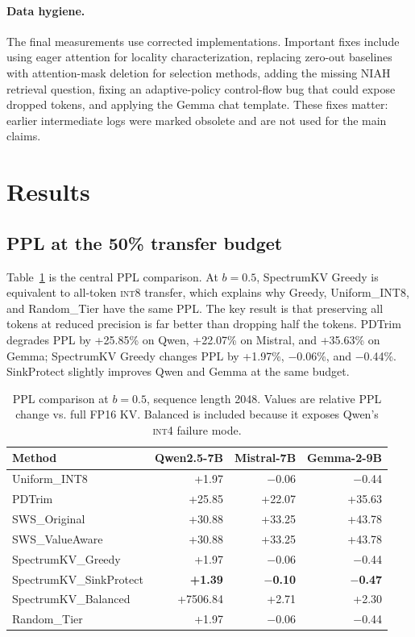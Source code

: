 \documentclass[11pt]{article}
\newcommand{\method}{SpectrumKV}
\newcommand{\niah}{NIAH}
\newcommand{\budget}{b}
\newcommand{\pct}{\%}
\newcommand{\intviii}{\textsc{int8}}
\newcommand{\intiv}{\textsc{int4}}
\theoremstyle{plain}
\theoremstyle{definition}
\begin{document}
\paragraph{Data hygiene.}
The final measurements use corrected implementations.  Important fixes include using eager attention for locality characterization, replacing zero-out baselines with attention-mask deletion for selection methods, adding the missing \niah{} retrieval question, fixing an adaptive-policy control-flow bug that could expose dropped tokens, and applying the Gemma chat template.  These fixes matter: earlier intermediate logs were marked obsolete and are not used for the main claims.

\section{Results}
\label{sec:results}

\subsection{PPL at the 50\pct{} transfer budget}
\label{sec:rq7}

Table~\ref{tab:ppl50} is the central PPL comparison.  At $\budget=0.5$, \method{} Greedy is equivalent to all-token \intviii{} transfer, which explains why Greedy, Uniform\_INT8, and Random\_Tier have the same PPL.  The key result is that preserving all tokens at reduced precision is far better than dropping half the tokens.  PDTrim degrades PPL by +25.85\pct{} on Qwen, +22.07\pct{} on Mistral, and +35.63\pct{} on Gemma; \method{} Greedy changes PPL by +1.97\pct{}, $-$0.06\pct{}, and $-$0.44\pct{}.  SinkProtect slightly improves Qwen and Gemma at the same budget.

\begin{table}[t]
\centering
\caption{PPL comparison at $\budget=0.5$, sequence length 2048.  Values are relative PPL change vs. full FP16 KV.  Balanced is included because it exposes Qwen's \intiv{} failure mode.}
\label{tab:ppl50}
\small
\begin{tabular}{lrrr}
\toprule
Method & Qwen2.5-7B & Mistral-7B & Gemma-2-9B \\
\midrule
Uniform\_INT8 & +1.97 & $-$0.06 & $-$0.44 \\
PDTrim & +25.85 & +22.07 & +35.63 \\
SWS\_Original & +30.88 & +33.25 & +43.78 \\
SWS\_ValueAware & +30.88 & +33.25 & +43.78 \\
\method{}\_Greedy & +1.97 & $-$0.06 & $-$0.44 \\
\method{}\_SinkProtect & \textbf{+1.39} & \textbf{$-$0.10} & \textbf{$-$0.47} \\
\method{}\_Balanced & +7506.84 & +2.71 & +2.30 \\
Random\_Tier & +1.97 & $-$0.06 & $-$0.44 \\
\bottomrule
\end{tabular}
\end{table}
\end{document}
